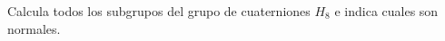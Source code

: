 \question 
Calcula todos los subgrupos del grupo de cuaterniones $H_8$ e indica cuales son normales.